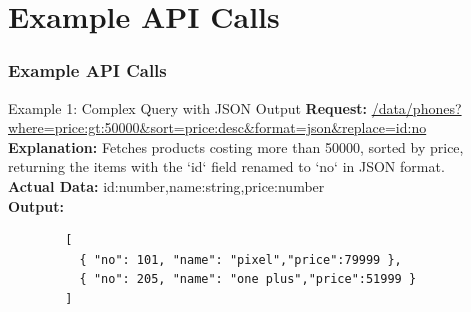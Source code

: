 \documentclass{beamer}
\begin{document}
\section{Example API Calls}
\begin{frame}[fragile]
 \frametitle{Example API Calls}
\begin{block}{Example 1: Complex Query with JSON Output}
 \small
\textbf{Request:}
\url{/data/phones?where=price:gt:50000&sort=price:desc&format=json&replace=id:no}
\vspace{0.2cm} \\
\textbf{Explanation:} Fetches products costing more than 50000, sorted by price, returning the items with the `id` field renamed to `no` in JSON format. \\
\textbf{Actual Data:} id:number,name:string,price:number \\
\textbf{Output:}
        \begin{verbatim}
        [
          { "no": 101, "name": "pixel","price":79999 },
          { "no": 205, "name": "one plus","price":51999 }
        ]
        \end{verbatim}
 \end{block}
\end{frame}

\end{document}
